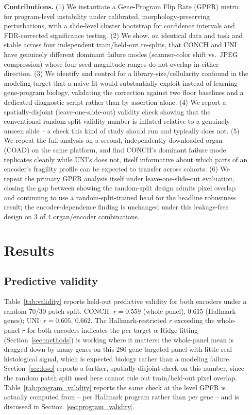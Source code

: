 \documentclass[11pt]{article}
\begin{document}
\textbf{Contributions.} (1) We instantiate a Gene-Program Flip Rate (GPFR) metric for program-level instability under calibrated, morphology-preserving perturbations, with a slide-level cluster bootstrap for confidence intervals and FDR-corrected significance testing. (2) We show, on identical data and task and stable across four independent train/held-out re-splits, that CONCH and UNI have genuinely different dominant failure modes (scanner-color shift vs.\ JPEG compression) whose four-seed magnitude ranges do not overlap in either direction. (3) We identify and control for a library-size/cellularity confound in the modeling target that a naive fit would substantially exploit instead of learning gene-program biology, validating the correction against two floor baselines and a dedicated diagnostic script rather than by assertion alone. (4) We report a spatially-disjoint (leave-one-slide-out) validity check showing that the conventional random-split validity number is inflated relative to a genuinely unseen slide -- a check this kind of study should run and typically does not. (5) We repeat the full analysis on a second, independently downloaded organ (COAD) on the same platform, and find CONCH's dominant failure mode replicates cleanly while UNI's does not, itself informative about which parts of an encoder's fragility profile can be expected to transfer across cohorts. (6) We repeat the primary GPFR analysis itself under leave-one-slide-out evaluation, closing the gap between showing the random-split design admits pixel overlap and continuing to use a random-split-trained head for the headline robustness result; the encoder-dependence finding is unchanged under this leakage-free design on 3 of 4 organ/encoder combinations.

\section{Results}
\label{sec:results}

\subsection{Predictive validity}
Table~\ref{tab:validity} reports held-out predictive validity for both encoders under a random 70/30 patch split. CONCH: $r=0.559$ (whole panel), $0.615$ (Hallmark genes); UNI: $r=0.605$, $0.662$. The Hallmark-restricted $r$ exceeding the whole-panel $r$ for both encoders indicates the per-target-$\alpha$ Ridge fitting (Section~\ref{sec:methods}) is working where it matters: the whole-panel mean is dragged down by many genes on this 280-gene targeted panel with little real histological signal, which is expected biology rather than a modeling failure. Section~\ref{sec:loso} reports a further, spatially-disjoint check on this number, since the random patch split used here cannot rule out train/held-out pixel overlap. Table~\ref{tab:program_validity} reports the same check at the level GPFR is actually computed from -- per Hallmark program rather than per gene -- and is discussed in Section~\ref{sec:program_validity}.
\end{document}
